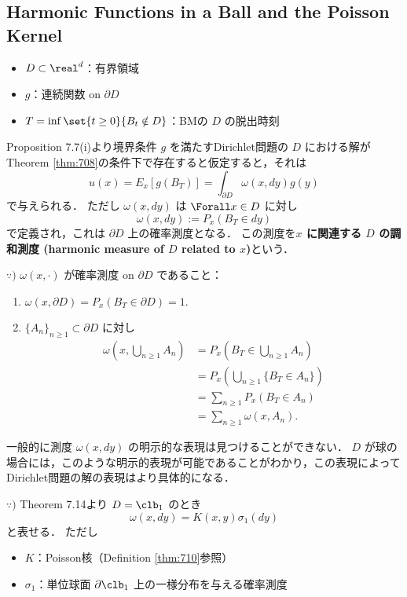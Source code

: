 \documentclass{jsarticle}
\begin{document}
\subsection{Harmonic Functions in a Ball and the Poisson Kernel}

\begin{itemize}
    \item 
    $D\subset \real^d$：有界領域
    \item
    $g$：連続関数 on $\partial D$
    \item
    $T=\inf\set{t\ge0}{B_t\notin D}$：BMの $D$ の脱出時刻
\end{itemize}

Proposition 7.7(i)より境界条件 $g$ を満たすDirichlet問題の $D$ における解がTheorem \ref{thm:708}の条件下で存在すると仮定すると，それは
$$
u(x)
= E_x[g(B_T)]
= \int_{\partial D}\omega(x, dy)g(y)
$$
で与えられる．
ただし $\omega(x, dy)$ は $\Forall x\in D$ に対し 
$$
\omega(x, dy)
:= P_x(B_T\in dy)
$$
で定義され，これは $\partial D$ 上の確率測度となる．
この測度を\textbf{$x$ に関連する $D$ の調和測度 (harmonic measure of $D$ related to $x$)}という．

\begin{screen}
    $\because)$
    $\omega(x, \cdot)$ が確率測度 on $\partial D$ であること：
    \begin{enumerate}[label=(\roman*)]
        \item
        $\omega(x, \partial D)=P_x(B_T\in \partial D)=1.$
        \item
        $\{A_n\}_{n\ge1}\subset \partial D$ に対し
        \begin{align}
            \omega(x, \bigcup_{n\ge1}A_n)
            &= P_x(B_T\in \bigcup_{n\ge1}A_n) \\
            &= P_x(\bigcup_{n\ge1}\{B_T\in A_n\}) \\
            &= \sum_{n\ge1}P_x(B_T\in A_n) \\
            &= \sum_{n\ge1}\omega(x, A_n).
        \end{align}
    \end{enumerate}
\end{screen}

一般的に測度 $\omega(x, dy)$ の明示的な表現は見つけることができない．
$D$ が球の場合には，このような明示的表現が可能であることがわかり，この表現によってDirichlet問題の解の表現はより具体的になる．

\begin{screen}
    $\because)$
    Theorem 7.14より $D=\clb_1$ のとき
    $$
    \omega(x, dy)
    = K(x, y)\sigma_1(dy)
    $$
    と表せる．
    ただし
    \begin{itemize}
        \item $K$：Poisson核（Definition \ref{thm:710}参照）
        \item $\sigma_1$：単位球面 $\partial\clb_1$ 上の一様分布を与える確率測度
    \end{itemize}
\end{screen}
\end{document}

